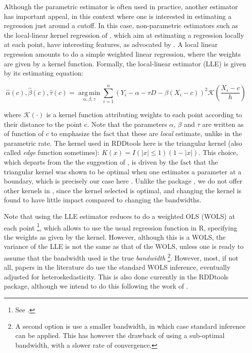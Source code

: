 \documentclass[english,nojss]{jss}\usepackage{graphicx, color}
\DeclareMathOperator*{\argmi}{arg\,min}
\newcommand{\argmin}[1]{\underset{#1}{\argmi}}
\begin{document}
Although the parametric estimator is often used in practice, another
estimator has important appeal, in this context where one is interested
in estimating a regression just around a cutoff. In this case, non-parametric
estimators such as the local-linear kernel regression of \citet{FanGijbels1992,FanGijbels1996},
which aim at estimating a regression locally at each point, have interesting
features, as advocated by \citet{Porter2003}. A local linear regression
amounts to do a simple weighted linear regression, where the weights
are given by a kernel function. Formally, the local-linear estimator
(LLE) is given by its estimating equation:



\begin{equation}
\hat{\alpha}(c),\hat{\beta}(c),\hat{\tau}(c)=\argmin{\alpha,\beta,\tau}\sum_{i=1}^{n}\left(Y_{i}-\alpha-\tau D-\beta(X_{i}-c)\right)^{2}\mathcal{K}\left(\frac{X_{i}-c}{h}\right)\label{eq:LLEform}
\end{equation}


where $\mathcal{K}(\cdot)$ is a kernel function attributing weights
to each point according to their distance to the point c. Note that
the parameters $\alpha$, $\beta$ and $\tau$ are written as of function
of $c$ to emphasize the fact that these are \emph{local} estimate,
unlike in the parametric rate. The kernel used in RDDtools here is
the triangular kernel (also called \emph{edge} function sometimes):
$K(x)=I(|x|\leq1)(1-|x|)$. This choice, which departs from the the
suggestion of \citet{LeeLemieux2010}, is driven by the fact that
the triangular kernel was shown to be optimal when one estimates a
parameter at a boundary, which is precisely our case here \citep{ChengFanEtAl1997}.
Unlike the package , we do not offer other kernels in ,
since the kernel selected is optimal, and changing the kernel is found
to have little impact compared to changing the bandwidths.

Note that using the LLE estimator reduces to do a weighted OLS (WOLS)
at each point%
\footnote{See \citep[equ. 3.4, page  58]{FanGijbels1996}. %
}, which allows to use the usual regression function  in
R, specifying the weights as given by the kernel. However, although
this is a WOLS, the variance of the LLE is not the same as that of
the WOLS, unless one is ready to assume that the bandwidth used is
the true \emph{bandwidth}%
\footnote{A second option is use a smaller bandwidth, in which case standard
inference can be applied. This has however the drawback of using a
sub-optimal bandwidth, with a slower rate of convergence. %
}. However, most, if not all, papers in the literature do use the standard
WOLS inference, eventually adjusted for heteroskedasticity. This is
also done currently in the RDDtools package, although we intend to
do this following the work of \citet{CalonicoCattaneoEtAl2012}. 
\end{document}
